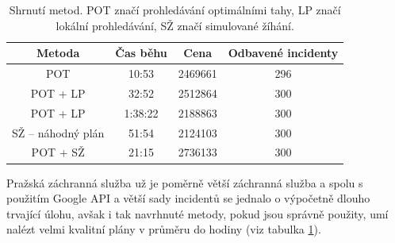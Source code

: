 \begin{table}[h!]
\centering
\begin{tabular}{|c|c|c|c|}
\hline
  \textbf{Metoda} & \textbf{Čas běhu} & \textbf{Cena} & \textbf{Odbavené incidenty} \\
\hline
  POT & 10:53 & 2469661 & 296 \\
\hline
  POT + LP & 32:52 & 2512864 & 300 \\
\hline
  POT + LP & 1:38:22 & 2188863 & 300 \\
\hline
  SŽ -- náhodný plán & 51:54 & 2124103 & 300 \\
\hline
  POT + SŽ & 21:15 & 2736133 & 300 \\
\hline
\end{tabular}
\caption{Shrnutí metod. POT značí prohledávání optimálními tahy, LP značí lokální prohledávání, SŽ značí simulované žíhání.}
\label{table:shrnutiMetod}
\end{table}

Pražská záchranná služba už je poměrně větší záchranná služba a spolu s použitím Google API a větší sady incidentů se jednalo o výpočetně dlouho trvající úlohu, avšak i tak
navrhnuté metody, pokud jsou správně použity, umí nalézt velmi kvalitní plány v průměru do hodiny (viz tabulka \ref{table:shrnutiMetod}).

